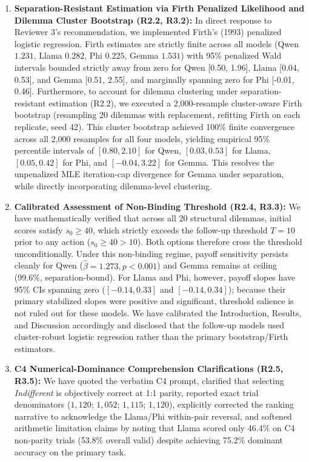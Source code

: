 \documentclass[11pt]{article}
\begin{document}
\begin{enumerate}[leftmargin=*]
\item \textbf{Separation-Resistant Estimation via Firth Penalized Likelihood and Dilemma Cluster Bootstrap (R2.2, R3.2):} In direct response to Reviewer 3's recommendation, we implemented Firth's (1993) penalized logistic regression. Firth estimates are strictly finite across all models (Qwen $1.231$, Llama $0.282$, Phi $0.225$, Gemma $1.531$) with 95\% penalized Wald intervals bounded strictly away from zero for Qwen [0.50, 1.96], Llama [0.04, 0.53], and Gemma [0.51, 2.55], and marginally spanning zero for Phi [-0.01, 0.46]. Furthermore, to account for dilemma clustering under separation-resistant estimation (R2.2), we executed a 2,000-resample cluster-aware Firth bootstrap (resampling 20 dilemmas with replacement, refitting Firth on each replicate, seed 42). This cluster bootstrap achieved 100\% finite convergence across all 2,000 resamples for all four models, yielding empirical 95\% percentile intervals of $[0.80, 2.10]$ for Qwen, $[0.03, 0.53]$ for Llama, $[0.05, 0.42]$ for Phi, and $[-0.04, 3.22]$ for Gemma. This resolves the unpenalized MLE iteration-cap divergence for Gemma under separation, while directly incorporating dilemma-level clustering.
\item \textbf{Calibrated Assessment of Non-Binding Threshold (R2.4, R3.3):} We have mathematically verified that across all 20 structural dilemmas, initial scores satisfy $s_0 \ge 40$, which strictly exceeds the follow-up threshold $T=10$ prior to any action ($s_0 \ge 40 > 10$). Both options therefore cross the threshold unconditionally. Under this non-binding regime, payoff sensitivity persists cleanly for Qwen ($\hat\beta=1.273, p<0.001$) and Gemma remains at ceiling (99.6\%, separation-bound). For Llama and Phi, however, payoff slopes have 95\% CIs spanning zero ($[-0.14, 0.33]$ and $[-0.14, 0.34]$); because their primary stabilized slopes were positive and significant, threshold salience is not ruled out for these models. We have calibrated the Introduction, Results, and Discussion accordingly and disclosed that the follow-up models used cluster-robust logistic regression rather than the primary bootstrap/Firth estimators.
\item \textbf{C4 Numerical-Dominance Comprehension Clarifications (R2.5, R3.5):} We have quoted the verbatim C4 prompt, clarified that selecting \textit{Indifferent} is objectively correct at 1:1 parity, reported exact trial denominators ($1,120$; $1,052$; $1,115$; $1,120$), explicitly corrected the ranking narrative to acknowledge the Llama/Phi within-pair reversal, and softened arithmetic limitation claims by noting that Llama scored only 46.4\% on C4 non-parity trials (53.8\% overall valid) despite achieving 75.2\% dominant accuracy on the primary task.

\end{enumerate}
\end{document}
